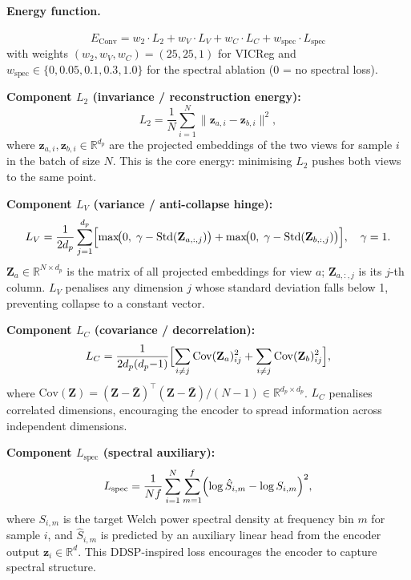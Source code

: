 \documentclass[11pt,a4paper]{article}
\begin{document}
\paragraph{Energy function.}
\begin{equation}
  \boxed{E_{\mathrm{Conv}} = w_2 \cdot L_2 + w_V \cdot L_V + w_C \cdot L_C
    + w_{\mathrm{spec}} \cdot L_{\mathrm{spec}}}
\end{equation}
with weights $(w_2, w_V, w_C) = (25, 25, 1)$ for VICReg and
$w_{\mathrm{spec}} \in \{0, 0.05, 0.1, 0.3, 1.0\}$ for the spectral ablation
(0 = no spectral loss).

\textbf{Component $L_2$ (invariance / reconstruction energy):}
\begin{equation}
  L_2 = \frac{1}{N} \sum_{i=1}^{N} \|\mathbf{z}_{a,i} - \mathbf{z}_{b,i}\|^2,
\end{equation}
where $\mathbf{z}_{a,i}, \mathbf{z}_{b,i} \in \mathbb{R}^{d_p}$ are the
projected embeddings of the two views for sample $i$ in the batch of size $N$.
This is the core energy: minimising $L_2$ pushes both views to the same point.

\textbf{Component $L_V$ (variance / anti-collapse hinge):}
\begin{equation}
  L_V = \frac{1}{2 d_p} \sum_{j=1}^{d_p} \Bigl[
    \max\!\bigl(0,\; \gamma - \mathrm{Std}(\mathbf{Z}_{a, :, j})\bigr) +
    \max\!\bigl(0,\; \gamma - \mathrm{Std}(\mathbf{Z}_{b, :, j})\bigr)
  \Bigr], \quad \gamma = 1.
\end{equation}
$\mathbf{Z}_{a} \in \mathbb{R}^{N \times d_p}$ is the matrix of all projected embeddings
for view $a$; $\mathbf{Z}_{a,:,j}$ is its $j$-th column.
$L_V$ penalises any dimension $j$ whose standard deviation falls below 1,
preventing collapse to a constant vector.

\textbf{Component $L_C$ (covariance / decorrelation):}
\begin{equation}
  L_C = \frac{1}{2 d_p(d_p{-}1)} \Bigl[
    \sum_{i \neq j} \mathrm{Cov}(\mathbf{Z}_a)_{ij}^2 +
    \sum_{i \neq j} \mathrm{Cov}(\mathbf{Z}_b)_{ij}^2
  \Bigr],
\end{equation}
where $\mathrm{Cov}(\mathbf{Z}) = (\mathbf{Z} - \bar{\mathbf{Z}})^\top
(\mathbf{Z} - \bar{\mathbf{Z}}) / (N-1) \in \mathbb{R}^{d_p \times d_p}$.
$L_C$ penalises correlated dimensions, encouraging the encoder to spread
information across independent dimensions.

\textbf{Component $L_{\mathrm{spec}}$ (spectral auxiliary):}
\begin{equation}
  L_{\mathrm{spec}} = \frac{1}{N f} \sum_{i=1}^{N} \sum_{m=1}^{f}
    \Bigl(\log \hat{S}_{i,m} - \log S_{i,m}\Bigr)^2,
\end{equation}
where $S_{i,m}$ is the target Welch power spectral density at frequency bin $m$
for sample $i$, and $\hat{S}_{i,m}$ is predicted by an auxiliary linear head
from the encoder output $\mathbf{z}_i \in \mathbb{R}^{d}$.
This DDSP-inspired loss encourages the encoder to capture spectral structure.
\end{document}

